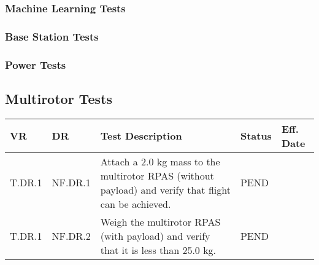 \documentclass[10pt,letterpaper]{article}
\begin{document}
\subsubsection{Machine Learning Tests}
\subsubsection{Base Station Tests}
\subsubsection{Power Tests}

\subsection{Multirotor Tests}
\begin{table}[H]
\begin{tabular}{ |p{1.1cm}|p{1.3cm}|p{9cm}|p{1.1cm}|p{1.7cm}|}
\hline
\textbf{VR}     & \textbf{DR}      & \textbf{Test Description}  	& \textbf{Status} & \textbf{Eff. Date} \\ \hline
T.DR.1 & NF.DR.1 & Attach a 2.0 kg mass to the multirotor RPAS (without payload) and verify that flight can be achieved. & PEND   & \\ \hline
T.DR.1 & NF.DR.2 & Weigh the multirotor RPAS (with payload) and verify that it is less than 25.0 kg. & PEND   & \\ \hline
\end{tabular}
\end{table}

\clearpage
{}



\end{document}
